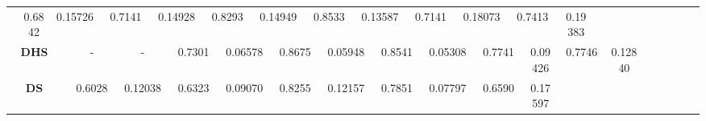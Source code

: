 \documentclass[10pt,twocolumn,letterpaper]{article}
\begin{document}
\begin{table}
\begin{center}
\begin{tabular}{|c|c|c|c|c|c|c|c|c|c|c|c|c|c|c|c|c|c|c|c|c|c|c|c|c|||c|c|c|c|c|c|c|c|||}
&\multicolumn{2}{|c|}{\textcolor[rgb]{1,0,0}{0.6842}}&\multicolumn{2}{|c|}{0.15726}%
&\multicolumn{2}{|c|}{0.7141}&\multicolumn{2}{|c|}{0.14928}%
&\multicolumn{2}{|c|}{0.8293}&\multicolumn{2}{|c|}{0.14949}%
&\multicolumn{2}{|c|}{0.8533}&\multicolumn{2}{|c|}{0.13587}%
&\multicolumn{2}{|c|}{0.7141}&\multicolumn{2}{|c|}{0.18073}%
&\multicolumn{2}{|c|}{0.7413}&\multicolumn{2}{|c|}{0.19383}%
\\
\multicolumn{4}{|c|}{\textbf{DHS}~\cite{liu2016dhsnet}}
&\multicolumn{2}{|c|}{-}&\multicolumn{2}{|c|}{-}%
&\multicolumn{2}{|c|}{\textcolor[rgb]{0,1,0}{0.7301}}&\multicolumn{2}{|c|}{\textcolor[rgb]{1,0,0}{0.06578}}%
&\multicolumn{2}{|c|}{0.8675}&\multicolumn{2}{|c|}{\textcolor[rgb]{0,1,0}{0.05948}}%
&\multicolumn{2}{|c|}{\textcolor[rgb]{0,1,0}{0.8541}}&\multicolumn{2}{|c|}{\textcolor[rgb]{0,1,0}{0.05308}}%
&\multicolumn{2}{|c|}{\textcolor[rgb]{1,0,0}{0.7741}}&\multicolumn{2}{|c|}{\textcolor[rgb]{1,0,0}{0.09426}}%
&\multicolumn{2}{|c|}{\textcolor[rgb]{1,0,0}{0.7746}}&\multicolumn{2}{|c|}{\textcolor[rgb]{1,0,0}{0.12840}}%
\\
\multicolumn{4}{|c|}{\textbf{DS}~\cite{Li2016DeepSaliency}}
&\multicolumn{2}{|c|}{0.6028}&\multicolumn{2}{|c|}{0.12038}%
&\multicolumn{2}{|c|}{0.6323}&\multicolumn{2}{|c|}{0.09070}%
&\multicolumn{2}{|c|}{0.8255}&\multicolumn{2}{|c|}{0.12157}%
&\multicolumn{2}{|c|}{0.7851}&\multicolumn{2}{|c|}{0.07797}%
&\multicolumn{2}{|c|}{0.6590}&\multicolumn{2}{|c|}{0.17597}%

\end{tabular}
\end{center}
\end{table}
\end{document}

